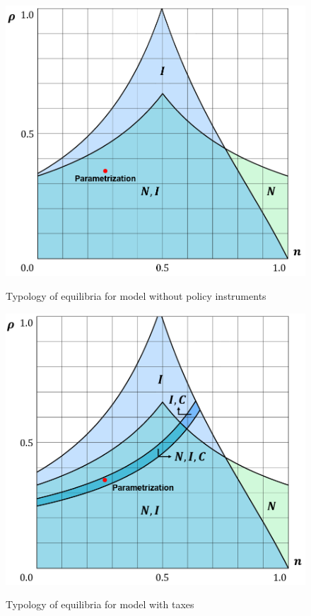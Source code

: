 \begin{figure}
    
    \caption{Typology of equilibria for model without policy instruments}
    \centering
    \includegraphics[scale=0.55]{Control-A.PNG}
     \label{fig:im1}

\end{figure}

\begin{figure}
    
    \caption{Typology of equilibria for model with taxes}
    \centering
    \includegraphics[scale=0.55]{Treatment1-A.PNG}
     \label{fig:im1}

\end{figure}


